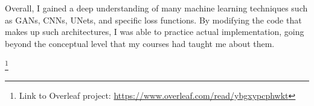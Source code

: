 \documentclass[10pt,twocolumn]{article}
\begin{document}
Overall, I gained a deep understanding of many machine learning techniques such as GANs, CNNs, UNets, and specific loss functions. By modifying the code that makes up such architectures, I was able to practice actual implementation, going beyond the conceptual level that my courses had taught me about them.

\footnote{Link to Overleaf project: \url{https://www.overleaf.com/read/ybgxypcphwkt}}


\printbibliography
\end{document}
